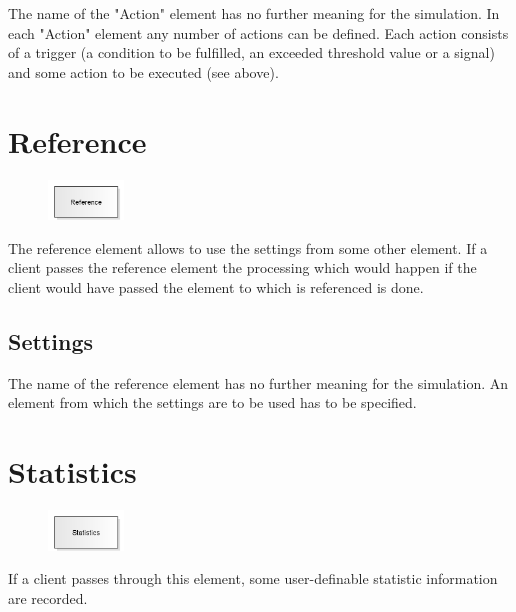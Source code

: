 The name of the "Action" element has no further meaning for the simulation.
In each "Action" element any number of actions can be defined. Each action
consists of a trigger (a condition to be fulfilled, an exceeded threshold value or a signal)
and some action to be executed (see above).


\section{Reference}
\label{ref:ModelElementReference}

\begin{figure}
\vspace{-22pt}
\includegraphics[width=2cm]{imageModelElementReference.png}
\vspace{-22pt}
\end{figure}

The reference element allows to use the settings from some other element.
If a client passes the reference element the processing which would happen
if the client would have passed the element to which is referenced is done.

\subsection*{Settings}

The name of the reference element has no further meaning for the simulation.
An element from which the settings are to be used has to be specified.


\section{Statistics}
\label{ref:ModelElementUserStatistic}

\begin{figure}
\vspace{-22pt}
\includegraphics[width=2cm]{imageModelElementUserStatistic.png}
\vspace{-22pt}
\end{figure}

If a client passes through this element, some user-definable statistic information are recorded.

